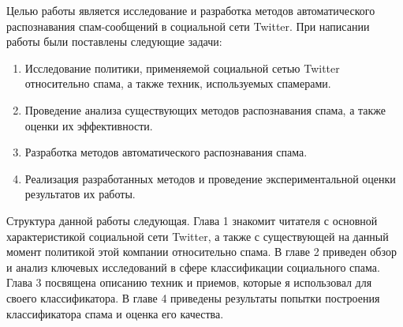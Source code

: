 {Целью работы является исследование и разработка методов автоматического распознавания спам-сообщений в социальной сети Twitter. При написании работы были поставлены следующие задачи:
\begin{enumerate}
\item Исследование политики, применяемой социальной сетью Twitter относительно спама, а также техник, используемых спамерами.
\item Проведение анализа существующих методов распознавания спама, а также оценки их эффективности.
\item Разработка методов автоматического распознавания спама.
\item Реализация разработанных методов и проведение экспериментальной оценки результатов их работы.
\end{enumerate}
}

Структура данной работы следующая. Глава 1 знакомит читателя с основной характеристикой социальной сети Twitter, а также с существующей на данный момент политикой этой компании относительно спама.
В главе 2 приведен обзор и анализ ключевых исследований в сфере классификации социального спама. Глава 3 посвящена описанию техник и приемов, которые я использовал для своего классификатора.
В главе 4 приведены результаты попытки построения классификатора спама и оценка его качества.
